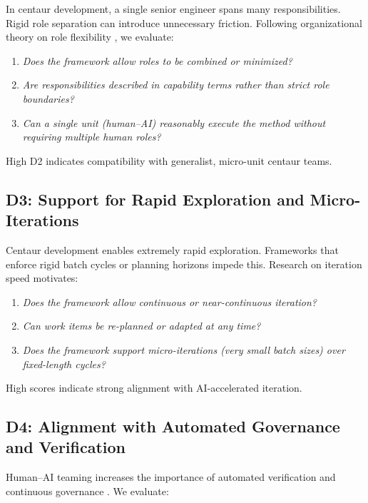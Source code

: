 \documentclass[11pt, a4paper, twocolumn]{article} %
\begin{document}
In centaur development, a single senior engineer spans many responsibilities.
Rigid role separation can introduce unnecessary friction. Following organizational
theory on role flexibility \citep{burnsstalker1961,mintzberg1979}, we evaluate:

\begin{enumerate}[label=D2.\arabic*), leftmargin=*]
    \item \emph{Does the framework allow roles to be combined or minimized?}
    \item \emph{Are responsibilities described in capability terms rather than
    strict role boundaries?}
    \item \emph{Can a single unit (human--AI) reasonably execute the method
    without requiring multiple human roles?}
\end{enumerate}

High D2 indicates compatibility with generalist, micro-unit centaur teams.

\subsection*{D3: Support for Rapid Exploration and Micro-Iterations}

Centaur development enables extremely rapid exploration. Frameworks that enforce
rigid batch cycles or planning horizons impede this. Research on iteration
speed \citep{forsgren2018accelerate,ries2011lean} motivates:

\begin{enumerate}[label=D3.\arabic*), leftmargin=*]
    \item \emph{Does the framework allow continuous or near-continuous
    iteration?}
    \item \emph{Can work items be re-planned or adapted at any time?}
    \item \emph{Does the framework support micro-iterations (very small batch
    sizes) over fixed-length cycles?}
\end{enumerate}

High scores indicate strong alignment with AI-accelerated iteration.

\subsection*{D4: Alignment with Automated Governance and Verification}

Human--AI teaming increases the importance of automated verification and
continuous governance \citep{forsgren2018accelerate,shneiderman2020human}. We
evaluate:
\end{document}
